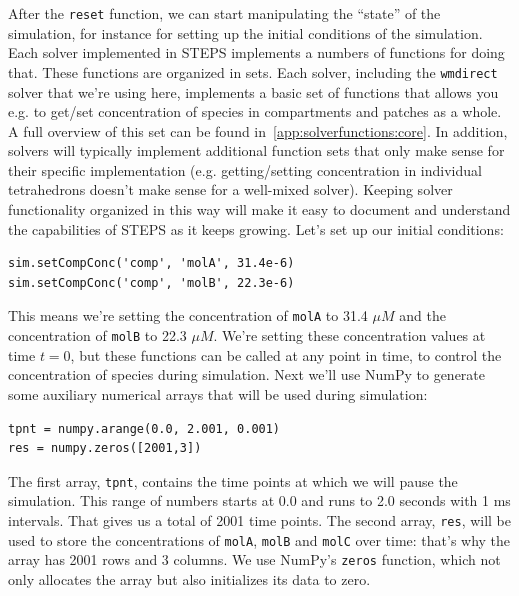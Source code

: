 \documentclass[a4paper,12pt]{book}
\begin{document}
After the \texttt{reset} function, we can start manipulating the ``state'' of the simulation, for instance for setting up the initial conditions of the simulation. Each solver implemented in STEPS implements a numbers of functions for doing that. These functions are organized in sets. Each solver, including the \texttt{wmdirect} solver that we're using here, implements a basic set of functions that allows you e.g. to get/set concentration of species in compartments and patches as a whole. A full overview of this set can be found in~\ref{app:solverfunctions:core}. In addition, solvers will typically implement additional function sets that only make sense for their specific implementation (e.g. getting/setting concentration in individual tetrahedrons doesn't make sense for a well-mixed solver). Keeping solver functionality organized in this way will make it easy to document and understand the capabilities of STEPS as it keeps growing. Let's set up our initial conditions:
\begin{verbatim}
sim.setCompConc('comp', 'molA', 31.4e-6)
sim.setCompConc('comp', 'molB', 22.3e-6)
\end{verbatim}
This means we're setting the concentration of \texttt{molA} to 31.4 $\mu M$ and the concentration of \texttt{molB} to 22.3 $\mu M$. We're setting these concentration values at time $t=0$, but these functions can be called at any point in time, to control the concentration of species during simulation. Next we'll use NumPy to generate some auxiliary numerical arrays that will be used during simulation:
\begin{verbatim}
tpnt = numpy.arange(0.0, 2.001, 0.001)
res = numpy.zeros([2001,3])
\end{verbatim}
The first array, \texttt{tpnt}, contains the time points at which we will pause the simulation. This range of numbers starts at 0.0 and runs to 2.0 seconds  with 1 ms intervals. That gives us a total of 2001 time points. The second array, \texttt{res}, will be used to store the concentrations of \texttt{molA}, \texttt{molB} and \texttt{molC} over time: that's why the array has 2001 rows and 3 columns. We use NumPy's \texttt{zeros} function, which not only allocates the array but also initializes its data to zero.
\end{document}
